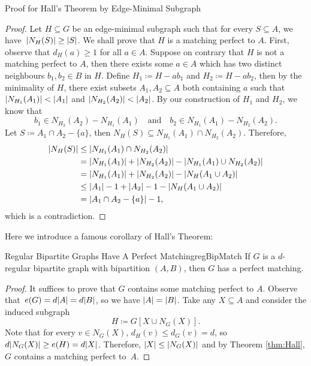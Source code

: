 \documentclass[math]{amznotes}
\theoremstyle{remark}
\newcommand{\0}{\mathbf{0}}
\newcommand{\1}{\mathbf{1}}
\begin{document}
\begin{genbox}{Proof for Hall's Theorem by Edge-Minimal Subgraph}
    \begin{proof}
        Let $H \subseteq G$ be an edge-minimal subgraph such that for every $S \subseteq A$, we have~${\left\lvert {N_H(S)} \right\rvert} \geq {\left\lvert {S} \right\rvert}$. We shall prove that $H$ is a matching perfect to $A$. First, observe that $d_H(a) \geq 1$ for all $a \in A$. Suppose on contrary that $H$ is not a matching perfect to $A$, then there exists some $a \in A$ which has two distinct neighbours $b_1, b_2 \in B$ in $H$. Define $H_1 \coloneqq H - ab_1$ and $H_2 \coloneqq H - ab_2$, then by the minimality of $H$, there exist subsets $A_1, A_2 \subseteq A$ both containing $a$ such that~${\left\lvert {N_{H_1}(A_1)} \right\rvert} < {\left\lvert {A_1} \right\rvert}$ and ${\left\lvert {N_{H_2}(A_2)} \right\rvert} < {\left\lvert {A_2} \right\rvert}$. By our construction of $H_1$ and $H_2$, we know that 
        \begin{equation*}
            b_1 \in N_{H_2}(A_2) - N_{H_1}(A_1) \quad\textrm{and}\quad b_2 \in N_{H_1}(A_1) - N_{H_2}(A_2).
        \end{equation*}
        Let $S \coloneqq A_1 \cap A_2 - \{a\}$, then $N_H(S) \subseteq N_{H_1}(A_1) \cap N_{H_2}(A_2)$. Therefore,
        \begin{align*}
            {\left\lvert {N_H(S)} \right\rvert} & \leq {\left\lvert {N_{H_1}(A_1) \cap N_{H_2}(A_2)} \right\rvert} \\
            & = {\left\lvert {N_{H_1}(A_1)} \right\rvert} + {\left\lvert {N_{H_2}(A_2)} \right\rvert} - {\left\lvert {N_{H_1}(A_1) \cup N_{H_2}(A_2)} \right\rvert} \\
            & = {\left\lvert {N_{H_1}(A_1)} \right\rvert} + {\left\lvert {N_{H_2}(A_2)} \right\rvert} - {\left\lvert {N_{H}(A_1 \cup A_2)} \right\rvert} \\
            & \leq {\left\lvert {A_1} \right\rvert} - 1 + {\left\lvert {A_2} \right\rvert} - 1 - {\left\lvert {N_{H}(A_1 \cup A_2)} \right\rvert} \\
            & = {\left\lvert {A_1 \cap A_2 - \{a\}} \right\rvert} - 1,
        \end{align*}
        which is a contradiction.
    \end{proof}
\end{genbox}
Here we introduce a famous corollary of Hall's Theorem:
\begin{corbox}{Regular Bipartite Graphs Have A Perfect Matching}{regBipMatch}
    If $G$ is a $d$-regular bipartite graph with bipartition $(A, B)$, then $G$ has a perfect matching.
    \tcblower
    \begin{proof}
        It suffices to prove that $G$ contains some matching perfect to $A$. Observe that~$e(G) = d{\left\lvert {A} \right\rvert} = d{\left\lvert {B} \right\rvert}$, so we have ${\left\lvert {A} \right\rvert} = {\left\lvert {B} \right\rvert}$. Take any $X \subseteq A$ and consider the induced subgraph 
        \begin{equation*}
            H \coloneqq G[X \cup N_G(X)].
        \end{equation*}
        Note that for every $v \in N_G(X)$, $d_H(v) \leq d_G(v) = d$, so $d{\left\lvert {N_G(X)} \right\rvert} \geq e(H) = d{\left\lvert {X} \right\rvert}$. Therefore, ${\left\lvert {X} \right\rvert} \leq {\left\lvert {N_G(X)} \right\rvert}$ and by Theorem \ref{thm:Hall}, $G$ contains a matching perfect to~$A$.
    \end{proof}
\end{corbox}
\end{document}

